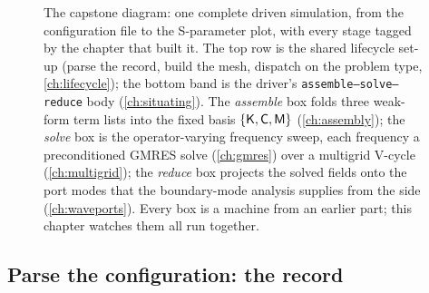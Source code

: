 \begin{figure}[p]
\caption[The complete driven pipeline, annotated by chapter]{The capstone
diagram: one complete driven simulation, from the configuration file to the
S-parameter plot, with every stage tagged by the chapter that built it. The
top row is the shared lifecycle set-up (parse the  record, build the
mesh, dispatch on the problem type, \cref{ch:lifecycle}); the bottom band is the
driver's \texttt{assemble--solve--reduce} body (\cref{ch:situating}). The
\emph{assemble} box folds three weak-form term lists into the fixed basis
$\{\mathsf{K},\mathsf{C},\mathsf{M}\}$ (\cref{ch:assembly}); the \emph{solve} box is the
operator-varying frequency sweep, each frequency a preconditioned GMRES solve
(\cref{ch:gmres}) over a multigrid V-cycle (\cref{ch:multigrid}); the
\emph{reduce} box projects the solved fields onto the port modes that the
boundary-mode analysis supplies from the side (\cref{ch:waveports}). Every box is
a machine from an earlier part; this chapter watches them all run together.}
\label{fig:trace-pipeline}
\end{figure}

\subsection{Parse the configuration: the \texorpdfstring{}{IoData} record}
\label{sec:trace-parse}


